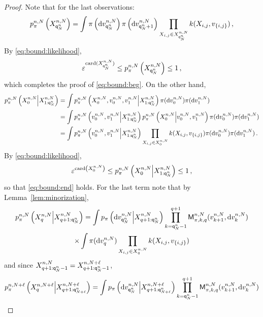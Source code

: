 \begin{proof}
Note that for the last observations:
\[
p_{\pi}^{n,N}\left(X_{{\mathsf{q}}^{n}_{N}}^{n,N}\right) = \int \pi\left(\mathrm{d} v_{{\mathsf{q}}^{n}_{N}}^{n,N}\right) \pi\left(\mathrm{d} v_{{\mathsf{q}}^{n}_{N}+1}^{n,N}\right) \prod_{X_{i,j}\in X_{{\mathsf{q}}^{n}_{N}}^{n,N}}k(X_{i,j},v_{\{i,j\}})\,,
\]
By \eqref{eq:bound:likelihood},
\[
\varepsilon^{\mathrm{card}(X_{{\mathsf{q}}^{n}_{N}}^{n,N})}\le p_{\pi}^{n,N}\left(X_{{\mathsf{q}}^{n}_{N}}^{n,N}\right)  \le 1\,,
\]
which completes the proof of \eqref{eq:bound:beg}. On the other hand,
\begin{align*}
p_{\pi}^{n,N}\left(X_{0}^{n,N}\middle|X_{1:{\mathsf{q}}^{n}_{N}}^{n,N}\right) &= \int p_{\pi}^{n,N}\left(X_{0}^{n,N},v_{0}^{n,N},v_{1}^{n,N}\middle|X_{1:{\mathsf{q}}^{n}_{N}}^{n,N}\right)\pi(\mathrm{d} v_{0}^{n,N})\pi(\mathrm{d} v_{1}^{n,N})\\
&=\int p_{\pi}^{n,N}\left(v_{0}^{n,N},v_{1}^{n,N}\middle|X_{1:{\mathsf{q}}^{n}_{N}}^{n,N}\right) p_{\pi}^{n,N}\left(X_{0}^{n,N}\middle|v_{0}^{n,N},v_{1}^{n,N}\right)\pi(\mathrm{d} v_{0}^{n,N})\pi(\mathrm{d} v_{1}^{n,N})\\
&=\int p_{\pi}^{n,N}\left(v_{0}^{n,N},v_{1}^{n,N}\middle|X_{1:{\mathsf{q}}^{n}_{N}}^{n,N}\right) \prod_{X_{i,j}\in X_{0}^{n,N}}k(X_{i,j},v_{\{i,j\}})\pi(\mathrm{d} v_{0}^{n,N})\pi(\mathrm{d} v_{1}^{n,N})\,.
\end{align*}
By \eqref{eq:bound:likelihood},
\[
\varepsilon^{\mathrm{card}\left(X_{0}^{n,N}\right)}\le p_{\pi}^{n,N}\left(X_{0}^{n,N}\middle|X_{1:{\mathsf{q}}^{n}_{N}}^{n,N}\right) \le 1\,,
\]
so that \eqref{eq:bound:end} holds. For the last term note that by Lemma~\ref{lem:minorization},  
\begin{multline}
\label{eq:decomp:prod:kernel}
p_{\pi}^{n,N}\left(X^{n,N}_{q}\middle|X^{n,N}_{q+1:{\mathsf{q}}^{n}_{N}}\right) = \int p_{\pi}\left(\mathrm{d} v_{{\mathsf{q}}^{n}_{N}}^{n,N}\middle | X^{n,N}_{q+1:{\mathsf{q}}^{n}_{N}}\right) \prod_{k ={\mathsf{q}}^{n}_{N}-1}^{q+1}\mathsf{M}^{n,N}_{\pi,k,q}(v_{k+1}^{n,N},\mathrm{d} v_k^{n,N})\\
\times\int \pi(\mathrm{d} v_q^{n,N})\prod_{X_{i,j}\in X_{q}^{n,N}}k(X_{i,j},v_{\{i,j\}})
\end{multline}
and since $X^{n,N}_{q+1:{\mathsf{q}}^{n}_{N}-1}=X^{n,N+\ell}_{q+1:{\mathsf{q}}^{n}_{N}-1}$,
\begin{multline}
\label{eq:decomp:prod:kernel:plus}
p_{\pi}^{n,N+\ell}\left(X^{n,N+\ell}_{q}\middle|X^{n,N+\ell}_{q+1:\ordermax{n}{N+\ell}}\right) = \int p_{\pi}\left(\rmd v_{\ordermax{n}{N}}^{n,N}\middle | X^{n,N+\ell}_{q+1:\ordermax{n}{N+\ell}}\right) \prod_{k =\ordermax{n}{N}-1}^{q+1}\kernel^{n,N}_{\pi,k,q}(v_{k+1}^{n,N},\rmd v_k^{n,N})\\

\end{multline}
\end{proof}
